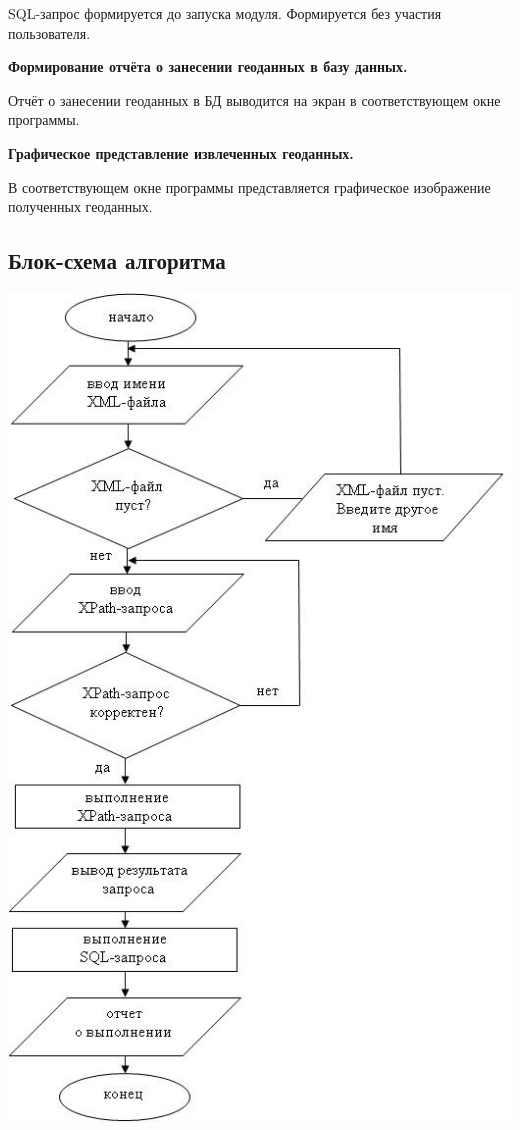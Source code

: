 \documentclass[12pt,a4paper,oneside]{article} %
\begin{document}
SQL-запрос формируется до запуска модуля. Формируется без участия \linebreak
пользователя.

\textbf{Формирование отчёта о занесении геоданных в базу данных.}

Отчёт о занесении геоданных в БД выводится на экран в соответствующем \linebreak
окне программы.

\textbf{Графическое представление извлеченных геоданных.}

В соответствующем окне программы представляется графическое \linebreak
изображение полученных геоданных.

\newpage
\subsection{Блок-схема алгоритма}

\includegraphics[width=0.9\linewidth]{box}
\end{document}
